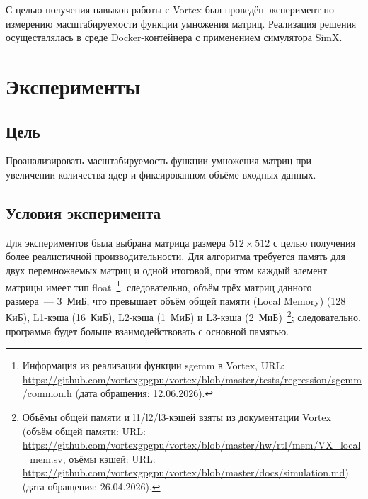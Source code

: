 \documentclass[a4paper]{article}
\begin{document}
С целью получения навыков работы с Vortex был проведён эксперимент по измерению масштабируемости функции умножения матриц. Реализация решения осуществлялась в среде Docker-контейнера с применением симулятора SimX.

\section{Эксперименты}

\subsection{Цель}
Проанализировать масштабируемость функции умножения матриц при увеличении количества ядер и фиксированном объёме входных данных.

\subsection{Условия эксперимента}

Для экспериментов была выбрана матрица размера $512\times512$ с целью получения более реалистичной производительности. Для алгоритма требуется память для двух перемножаемых матриц и одной итоговой, при этом каждый элемент матрицы имеет тип float~\footnote{Информация из реализации функции sgemm в Vortex, URL: \url{https://github.com/vortexgpgpu/vortex/blob/master/tests/regression/sgemm/common.h} (дата обращения: 12.06.2026).}, следовательно, объём трёх матриц данного размера~--- 3~МиБ, что превышает объём общей памяти (Local Memory) (128 КиБ), L1-кэша (16~КиБ), L2-кэша (1~МиБ) и L3-кэша (2~МиБ)~\footnote{Объёмы общей памяти и l1/l2/l3-кэшей взяты из документации Vortex (объём общей памяти: URL: \url{https://github.com/vortexgpgpu/vortex/blob/master/hw/rtl/mem/VX_local_mem.sv}, оъёмы кэшей: URL: \url{https://github.com/vortexgpgpu/vortex/blob/master/docs/simulation.md}) (дата обращения: 26.04.2026).}; следовательно, программа будет больше взаимодействовать с основной памятью.
\end{document}
